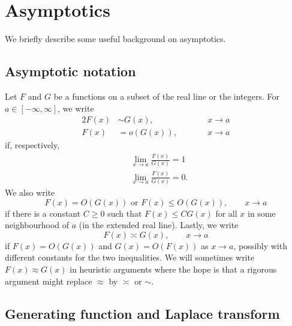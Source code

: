 
\section{Asymptotics}
\label{sec:asymp}

We briefly describe some useful background on asymptotics.


\subsection{Asymptotic notation}

Let $F$ and $G$ be a functions on a subset of the real line or the integers.
For $a\in[-\infty,\infty]$, we write
\begin{alignat}{2}
F(x) &\sim G(x), &&\qquad x \to a \\
F(x) &= o(G(x)), &&\qquad x \to a
\end{alignat}
if, respectively,
\begin{align}
&\lim_{x\to a} \frac{F(x)}{G(x)} = 1 \\
&\lim_{x\to a} \frac{F(x)}{G(x)} = 0.
\end{align}
We also write
\begin{equation}
F(x) = O(G(x))
	\text{ or }
F(x) \le O(G(x)),
	\qquad
x \to a
\end{equation}
if there is a constant $C \ge 0$ such that $F(x) \le C G(x)$ for all
$x$ in some neighbourhood of $a$ (in the extended real line). Lastly, we write
\begin{equation}
F(x) \asymp G(x),
	\qquad
x \to a
\end{equation}
if $F(x) = O(G(x))$ and $G(x) = O(F(x))$ as $x\to a$, possibly with
different constants for the two inequalities. We will sometimes write
$F(x) \approx G(x)$ in heuristic
arguments where the hope is that a rigorous argument might replace $\approx$
by $\asymp$ or $\sim$.


\subsection{Generating function and Laplace transform}

